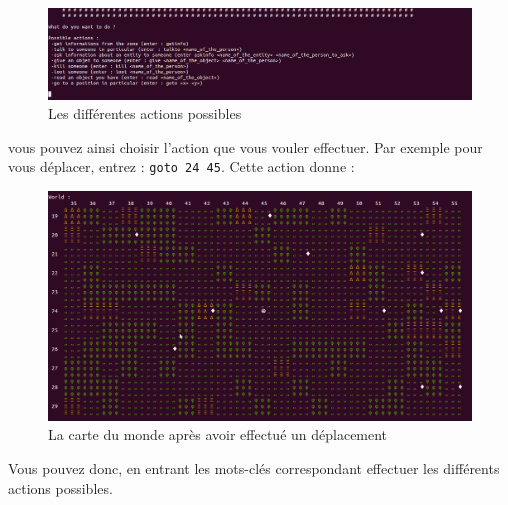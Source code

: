 \documentclass[asi]{picINSA}
\begin{document}
\begin{figure}[!ht]
  \begin{center}
    \includegraphics[width=1\textwidth]{images/screenshootUI01.png}
    \caption{Les différentes actions possibles}	
  \end{center}
\end{figure}
 vous pouvez ainsi choisir l'action que vous vouler effectuer. Par exemple pour vous déplacer, entrez : \verb+goto 24 45+. Cette action donne :
\begin{figure}[!ht]
  \begin{center}
    \includegraphics[width=1\textwidth]{images/screenshootCarte02.png}
    \caption{La carte du monde après avoir effectué un déplacement}	
  \end{center}
\end{figure}

Vous pouvez donc, en entrant les mots-clés correspondant effectuer les différents actions possibles.
\end{document}
